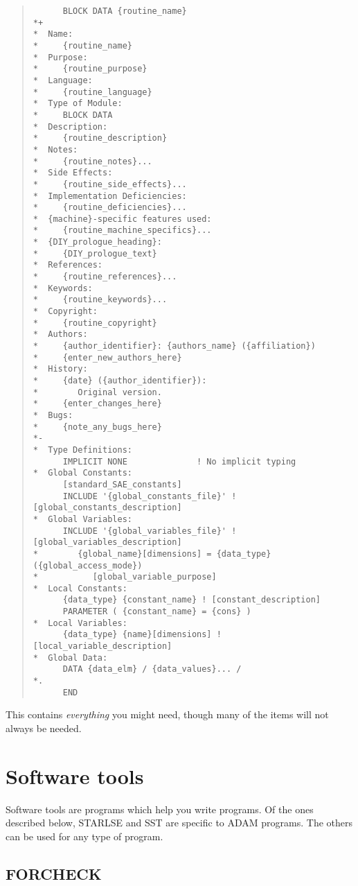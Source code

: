 \begin{quote}

\begin{small}
\begin{verbatim}
      BLOCK DATA {routine_name}
*+
*  Name:
*     {routine_name}
*  Purpose:
*     {routine_purpose}
*  Language:
*     {routine_language}
*  Type of Module:
*     BLOCK DATA
*  Description:
*     {routine_description}
*  Notes:
*     {routine_notes}...
*  Side Effects:
*     {routine_side_effects}...
*  Implementation Deficiencies:
*     {routine_deficiencies}...
*  {machine}-specific features used:
*     {routine_machine_specifics}...
*  {DIY_prologue_heading}:
*     {DIY_prologue_text}
*  References:
*     {routine_references}...
*  Keywords:
*     {routine_keywords}...
*  Copyright:
*     {routine_copyright}
*  Authors:
*     {author_identifier}: {authors_name} ({affiliation})
*     {enter_new_authors_here}
*  History:
*     {date} ({author_identifier}):
*        Original version.
*     {enter_changes_here}   
*  Bugs:
*     {note_any_bugs_here}
*-
*  Type Definitions:
      IMPLICIT NONE              ! No implicit typing
*  Global Constants:
      [standard_SAE_constants]
      INCLUDE '{global_constants_file}' ! [global_constants_description]
*  Global Variables:
      INCLUDE '{global_variables_file}' ! [global_variables_description]
*        {global_name}[dimensions] = {data_type} ({global_access_mode})
*           [global_variable_purpose]
*  Local Constants:
      {data_type} {constant_name} ! [constant_description]
      PARAMETER ( {constant_name} = {cons} )
*  Local Variables:
      {data_type} {name}[dimensions] ! [local_variable_description]
*  Global Data:
      DATA {data_elm} / {data_values}... /
*.
      END
\end{verbatim}
\end{small}

\end{quote}
This contains {\em everything} you might need, though many of the items will
not always be needed.

\section{Software tools}
\label{S_softools}

Software tools are programs which help you write programs.
Of the ones described below, STARLSE and SST are specific to ADAM programs.
The others can be used for any type of program.

\subsection{FORCHECK} 

